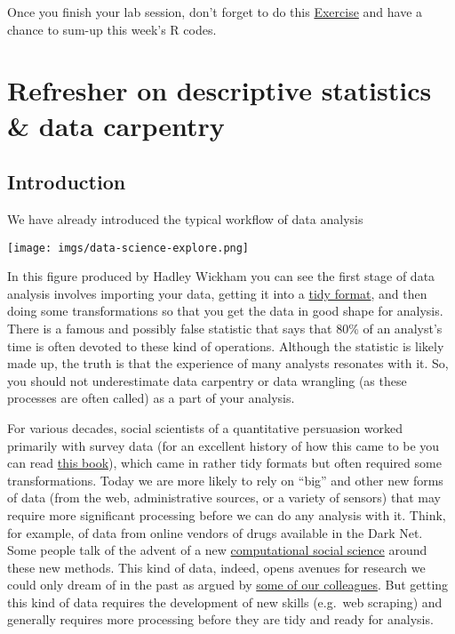 \documentclass[
]{book}
\begin{document}
Once you finish your lab session, don't forget to do this \href{https://eonk.shinyapps.io/MCD_ex}{Exercise} and have a chance to sum-up this week's R codes.

\chapter{Refresher on descriptive statistics \& data carpentry}\label{refresher-on-descriptive-statistics-data-carpentry}

\section{Introduction}\label{introduction-1}

We have already introduced the typical workflow of data analysis

\texttt{[image: imgs/data-science-explore.png]}

In this figure produced by Hadley Wickham you can see the first stage of data analysis involves importing your data, getting it into a \href{http://vita.had.co.nz/papers/tidy-data.pdf}{tidy format}, and then doing some transformations so that you get the data in good shape for analysis. There is a famous and possibly false statistic that says that 80\% of an analyst's time is often devoted to these kind of operations. Although the statistic is likely made up, the truth is that the experience of many analysts resonates with it. So, you should not underestimate data carpentry or data wrangling (as these processes are often called) as a part of your analysis.

For various decades, social scientists of a quantitative persuasion worked primarily with survey data (for an excellent history of how this came to be you can read \href{https://global.oup.com/academic/product/identities-and-social-change-in-britain-since-1940-9780199587650?cc=gb&lang=en&\#}{this book}), which came in rather tidy formats but often required some transformations. Today we are more likely to rely on ``big'' and other new forms of data (from the web, administrative sources, or a variety of sensors) that may require more significant processing before we can do any analysis with it. Think, for example, of data from online vendors of drugs available in the Dark Net. Some people talk of the advent of a new \href{http://science.sciencemag.org/content/323/5915/721/tab-pdf}{computational social science} around these new methods. This kind of data, indeed, opens avenues for research we could only dream of in the past as argued by \href{https://www.sciencedirect.com/science/article/pii/S0955395919300313?via\%3Dihub}{some of our colleagues}. But getting this kind of data requires the development of new skills (e.g.~web scraping) and generally requires more processing before they are tidy and ready for analysis.
\end{document}
